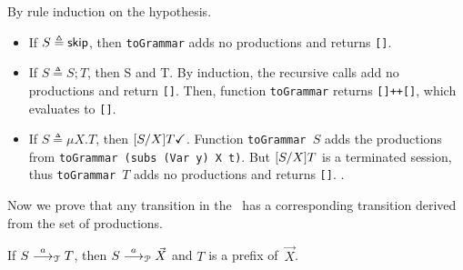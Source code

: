 \begin{itemizeproof}
  By rule induction  on the hypothesis.
  \begin{itemize}
  \item If $S\triangleq \mathsf{skip}$, then \lstinline{toGrammar} adds no
    productions and returns \lstinline{[]}.
  \item If $S\triangleq S;T$, then \DONE S and \DONE T. By induction,
    the recursive calls add no productions and return
    \lstinline|[]|. Then, function \lstinline|toGrammar| returns
    \lstinline|[]++[]|, which evaluates to \lstinline|[]|.
  \item If $S\triangleq \mu X. T$, then
    $[{S}/{X}]T \checkmark$.
    Function \lstinline|toGrammar |$S$ adds the productions from
    \lstinline|toGrammar (subs (Var y) X t)|. But $[{S}/{X}] T$ is a
    terminated session, thus \lstinline{toGrammar }$T$ adds no
    productions and returns \lstinline{[]}. .
  \end{itemize}
\end{itemizeproof}

Now we prove that any transition in the \LTS\ has a
corresponding transition derived from the set of productions.

\begin{lemma}
  \label{lem:type-to-prod}
  If $S \stackrel{a}{\longrightarrow}_\mathcal T T$, then 
  $S \stackrel{a}{\longrightarrow}_\mathcal P \vec X$ and  $T$ is a
  prefix of~$\vec X$.
%
\end{lemma}

